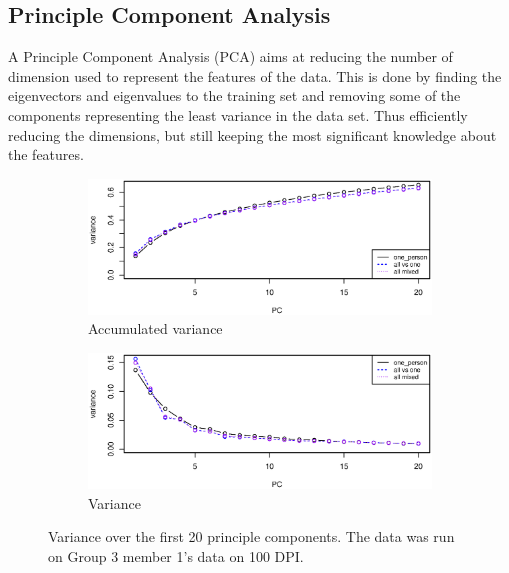 \subsection{Principle Component Analysis}
A Principle Component Analysis (PCA) aims at reducing the number of dimension used to represent the features of the data.
This is done by finding the eigenvectors and eigenvalues to the training set and removing some of the components representing the least variance in the data set.
Thus efficiently reducing the dimensions, but still keeping the most significant knowledge about the features.

\begin{figure}[H]
\centering
\begin{subfigure}{0.70\textwidth}
\centering
\includegraphics[width=\textwidth]{graphics/pca_acc_variance}
\caption{Accumulated variance}
\label{fig:pca_accumulated_var}
\end{subfigure}
\begin{subfigure}{0.70\textwidth}
\centering
\includegraphics[width=\textwidth]{graphics/pca_variance}
\caption{Variance}
\label{fig:pca_accumulated_var}
\end{subfigure}
\caption[PCA variance]{Variance over the first 20 principle components.
The data was run on Group 3 member 1's data on 100 DPI. }
\label{fig:variance}
\end{figure}

